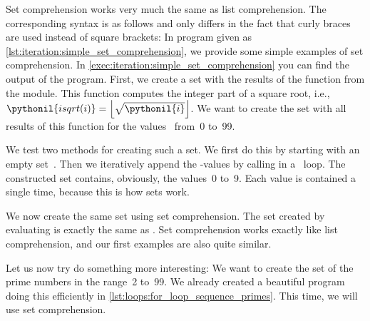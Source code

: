 Set comprehension works very much the same as list comprehension.
The corresponding syntax is as follows and only differs in the fact that curly braces are used instead of square brackets:%
%
%
\FloatBarrier%
%
%
%
%
In program  given as \cref{lst:iteration:simple_set_comprehension}, we provide some simple examples of set comprehension.
In \cref{exec:iteration:simple_set_comprehension} you can find the output of the program.
First, we create a set with the results of the  function from the  module.
This function computes the integer part of a square root, i.e., $\pythonil{isqrt(i)}=\left\lfloor\sqrt{\pythonil{i}}\right\rfloor$.
We want to create the set with all results of this function for the values~ from~0 to~99.

We test two methods for creating such a set.
We first do this by starting with an empty set~.
Then we iteratively append the -values by calling  in a ~loop.
The constructed set contains, obviously, the values~0 to~9.
Each value is contained a single time, because this is how sets work.%
%
\begin{sloppypar}%
We now create the same set using set comprehension.
The set  created by evaluating  is exactly the same as .
Set comprehension works exactly like list comprehension, and our first examples are also quite similar.%
\end{sloppypar}%
%
Let us now try do something more interesting:
We want to create the set  of the prime numbers in the range~2 to~99.
We already created a beautiful program doing this efficiently in \cref{lst:loops:for_loop_sequence_primes}.
This time, we will use set comprehension.

